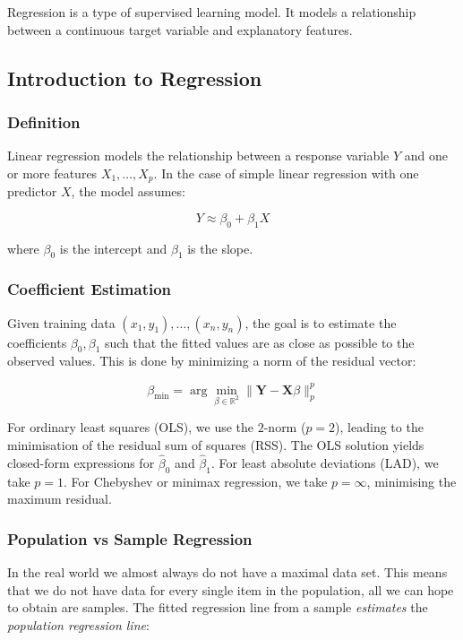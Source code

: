 \documentclass[9pt]{extarticle}
\begin{document}
Regression is a type of supervised learning model. It models a relationship between 
a continuous target variable and explanatory features.
\subsection{Introduction to Regression}


\subsubsection*{Definition}

Linear regression models the relationship between a response variable $Y$ and one or more features $X_1, \dots, X_p$. In the case of simple linear regression with one predictor $X$, the model assumes:

\[
Y \approx \beta_0 + \beta_1 X
\]

where $\beta_0$ is the intercept and $\beta_1$ is the slope.

\subsubsection*{Coefficient Estimation}

Given training data $(x_1, y_1), \dots, (x_n, y_n)$, the goal is to estimate the coefficients $\beta_0, \beta_1$ such that the fitted values are as close as possible to the observed values. This is done by minimizing a norm of the residual vector:

\[
\beta_{\text{min}} = \arg\min_{\beta \in \mathbb{R}^2} \| \mathbf{Y} - \mathbf{X} \beta \|_p^p
\]

For ordinary least squares (OLS), we use the $2$-norm ($p=2$), 
leading to the minimisation of the residual sum of squares (RSS). 
The OLS solution yields closed-form expressions for $\hat{\beta}_0$ and 
$\hat{\beta}_1$.
 For least absolute deviations (LAD), we take $p = 1$. 
 For Chebyshev or minimax regression, we take $p = \infty$, minimising the maximum residual.


\subsubsection*{Population vs Sample Regression}

In the real world we almost always do not have a maximal data set. 
This means that we do not have data for every single item in the population, 
all we can hope to obtain are samples. 
The fitted regression line from a 
sample \textit{estimates} the \emph{population regression line}:
\end{document}
